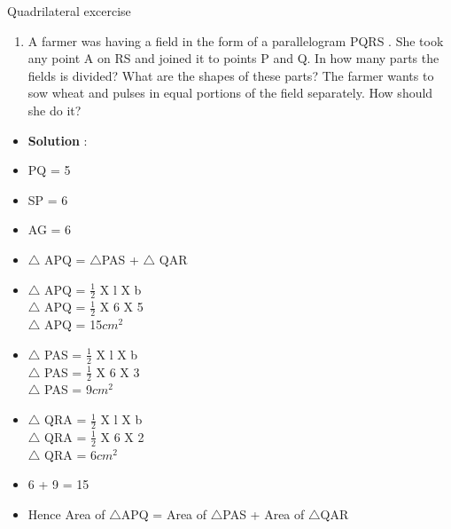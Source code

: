 \begin{frame}{Quadrilateral excercise}
\begin{enumerate}
\conti
\item A farmer was having a field in the form of a
parallelogram PQRS . She took any point A on
RS and joined it to points P and Q. In how
many parts the fields is divided? What are the
shapes of these parts? The farmer wants to sow
wheat and pulses in equal portions of the field
separately. How should she do it?
\seti
\end{enumerate}
\begin{itemize}
\item \textbf{Solution} :
\begin{center}

\end{center}
\end{itemize}
\end{frame}
\begin{frame}
\begin{itemize}
\item PQ = 5\\
\item SP = 6\\
\item AG = 6\\
\item$\triangle$ APQ = $\triangle$PAS + $\triangle$ QAR\\ 
\item$\triangle$ APQ = $\frac{1}{2}$ X l X b\\
$\triangle$ APQ = $\frac{1}{2}$ X 6 X 5\\
$\triangle$ APQ = 15$cm^2$
\item$\triangle$ PAS = $\frac{1}{2}$ X l X b\\
$\triangle$ PAS = $\frac{1}{2}$ X 6 X 3\\
$\triangle$ PAS = 9$cm^2$\\
\item$\triangle$ QRA = $\frac{1}{2}$ X l X b\\
$\triangle$ QRA = $\frac{1}{2}$ X 6 X 2\\
$\triangle$ QRA = 6$cm^2$\\
\item 6 + 9 = 15
\item Hence Area of $\triangle$APQ = Area of $\triangle$PAS + Area of $\triangle$QAR\\
\end{itemize}
\end{frame}
